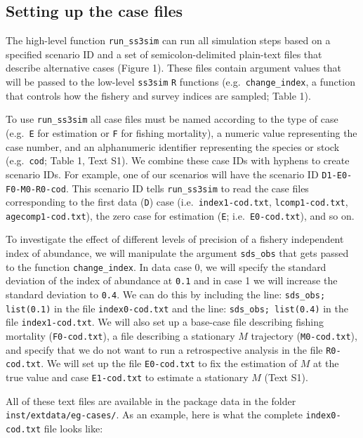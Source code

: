\documentclass[11pt]{article}
\begin{document}
\subsection*{Setting up the case files}

The high-level function \texttt{run\_ss3sim} can run all simulation steps based on a specified scenario ID and a set of semicolon-delimited plain-text files that describe alternative cases (Figure 1). These files contain argument values that will be passed to the low-level \texttt{ss3sim} \texttt{R} functions (e.g.~\texttt{change\_index}, a function that controls how the fishery and survey indices are sampled; Table 1).

To use \texttt{run\_ss3sim} all case files must be named according to the type of case (e.g.~\texttt{E} for estimation or \texttt{F} for fishing mortality), a numeric value representing the case number, and an alphanumeric identifier representing the species or stock (e.g.~\texttt{cod}; Table 1, Text S1). We combine these case IDs with hyphens to create scenario IDs. For example, one of our scenarios will have the scenario ID \texttt{D1-E0-F0-M0-R0-cod}. This scenario ID tells \texttt{run\_ss3sim} to read the case files corresponding to the first data (\texttt{D}) case (i.e.~\texttt{index1-cod.txt}, \texttt{lcomp1-cod.txt}, \texttt{agecomp1-cod.txt}), the zero case for estimation (\texttt{E}; i.e.~\texttt{E0-cod.txt}), and so on.

To investigate the effect of different levels of precision of a fishery independent index of abundance, we will manipulate the argument \texttt{sds\_obs} that gets passed to the function \texttt{change\_index}. In data case 0, we will specify the standard deviation of the index of abundance at \texttt{0.1} and in case 1 we will increase the standard deviation to \texttt{0.4}. We can do this by including the line: \texttt{sds\_obs; list(0.1)} in the file \texttt{index0-cod.txt} and the line: \texttt{sds\_obs; list(0.4)} in the file \texttt{index1-cod.txt}. We will also set up a base-case file describing fishing mortality (\texttt{F0-cod.txt}), a file describing a stationary $M$ trajectory (\texttt{M0-cod.txt}), and specify that we do not want to run a retrospective analysis in the file \texttt{R0-cod.txt}. We will set up the file \texttt{E0-cod.txt} to fix the estimation of $M$ at the true value and case \texttt{E1-cod.txt} to estimate a stationary $M$ (Text S1).

All of these text files are available in the package data in the folder \texttt{inst/extdata/eg-cases/}. As an example, here is what the complete \texttt{index0-cod.txt} file looks like:
\end{document}
